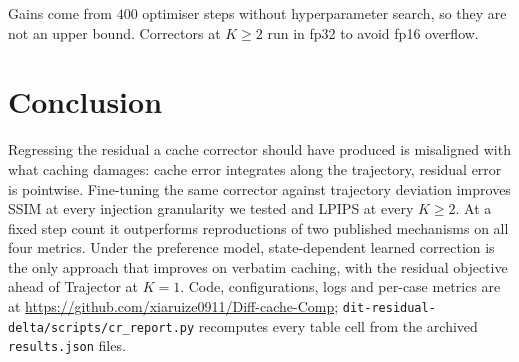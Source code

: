\documentclass[conference,compsoc]{IEEEtran}
\newcommand{\ourmethod}{Trajector}
\begin{document}
\begin{table}[t]
\centering
\caption{The $K{=}1$ correctors, trained with uniform anchors, under uniform
anchors and under the frozen TeaCache-style schedule (test, $n{=}72$).}
\label{tab:sched}
\small
\setlength{\tabcolsep}{3pt}

\end{table}

Gains come from $400$ optimiser steps without hyperparameter search, so they
are not an upper bound. Correctors at $K{\ge}2$ run in fp32 to avoid fp16
overflow.

\section{Conclusion}

Regressing the residual a cache corrector should have produced is misaligned
with what caching damages: cache error integrates along the trajectory, residual
error is pointwise. Fine-tuning the same corrector against trajectory deviation improves SSIM at every injection
granularity we tested and LPIPS at every $K{\ge}2$. At a fixed step count it
outperforms reproductions of two published mechanisms on all four metrics.
Under the preference model, state-dependent learned correction is the only
approach that improves on verbatim caching, with the residual objective ahead
of \ourmethod{} at $K{=}1$. Code, configurations, logs and per-case metrics
are at \url{https://github.com/xiaruize0911/Diff-cache-Comp};
\nolinkurl{dit-residual-delta/scripts/cr_report.py} recomputes every table cell from the archived \texttt{results.json} files.



\end{document}
